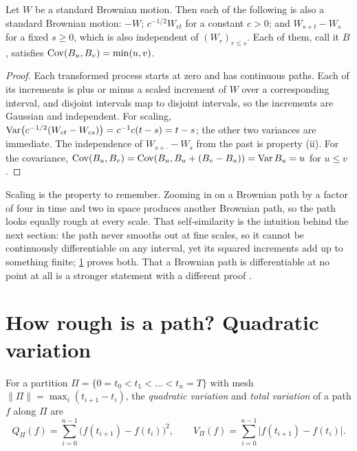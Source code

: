 \begin{chapterrefs}
\begin{proposition}\label{prop3:bmprops}
Let $W$ be a standard Brownian motion. Then each of the following is also a standard Brownian motion:
$-W$; $c^{-1/2}W_{ct}$ for a constant $c>0$; and $W_{s+t}-W_s$ for a fixed $s\ge 0$, which is also
independent of $(W_r)_{r\le s}$. Each of them, call it $B$, satisfies $\operatorname{Cov}(B_u,B_v)=\min(u,v)$.
\end{proposition}

\begin{proof}
Each transformed process starts at zero and has continuous paths. Each of its increments is plus or
minus a scaled increment of $W$ over a corresponding interval, and disjoint intervals map to disjoint
intervals, so the increments are Gaussian and independent. For scaling,
$\operatorname{Var}\bigl(c^{-1/2}(W_{ct}-W_{cs})\bigr)=c^{-1}c(t-s)=t-s$; the other two variances are immediate. The
independence of $W_{s+\cdot}-W_s$ from the past is property (ii). For the covariance,
$\operatorname{Cov}(B_u,B_v)=\operatorname{Cov}(B_u,B_u+(B_v-B_u))=\operatorname{Var} B_u=u$ for $u\le v$.
\end{proof}

Scaling is the property to remember. Zooming in on a Brownian path by a factor of four in time and two
in space produces another Brownian path, so the path looks equally rough at every scale. That
self-similarity is the intuition behind the next section: the path never smooths out at fine scales,
so it cannot be continuously differentiable on any interval, yet its squared increments add up to
something finite; \cref{sec3:qv} proves both. That a Brownian path is differentiable at no point at
all is a stronger statement with a different proof \parencite[Chapter~1]{morters2010}.

\FloatBarrier
\section{How rough is a path? Quadratic variation}
\label{sec3:qv}

\begin{definition}\label{def3:qv}
For a partition $\Pi=\{0=t_0<t_1<\dots<t_n=T\}$ with mesh $\lVert\Pi\rVert=\max_i(t_{i+1}-t_i)$, the
\emph{quadratic variation} and \emph{total variation} of a path $f$ along $\Pi$ are
\begin{equation}\label{eq3:qvdef}
  Q_\Pi(f)=\sum_{i=0}^{n-1}\bigl(f(t_{i+1})-f(t_i)\bigr)^2,\qquad
  V_\Pi(f)=\sum_{i=0}^{n-1}\bigl|f(t_{i+1})-f(t_i)\bigr| .
\end{equation}
\end{definition}


\end{chapterrefs}
